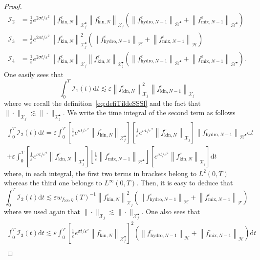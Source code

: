 \documentclass[10pt]{amsart}
\theoremstyle{definition}\newtheorem{defi}[theo]{Definition}\newtheorem{rema}[theo]{Remark}\newtheorem{exam}[theo]{Example}\newtheorem{exem}[theo]{Example}\newtheorem{nota}[theo]{Notation}
\newcommand{\ns}{\mathrm{NS}}
\newcommand{\hyd}{\mathrm{hydro}}
\newcommand{\mix}{\mathrm{mix}}
\newcommand{\kin}{\mathrm{kin}}
\renewcommand{\d}{\mathrm{d}}
\newcommand{\XX}{\mathcal{X}}
\newcommand{\HH}{\mathcal{H}}
\newcommand{\FFF}{\mathscr{F}}
\newcommand{\HHH}{\mathscr{H}}
\newcommand{\GGG}{\mathscr{X}}
\newcommand{\scI}{\mathscr{I}}
\newcommand{\SSs}{\HH}
\newcommand{\SSsp}{\HH^{\bullet}}
\newcommand{\SSSs}{\HHH}
\newcommand{\SSh}{\bm{\XX}}
\newcommand{\SShp}{\bm{\XX}^{\bullet}}
\newcommand{\SSSh}{\pmb{\GGG}}
\newcommand{\SSSm}{\FFF}
\newcommand*\eps{{\varepsilon}}
\begin{document}
\begin{proof}
\begin{align*}
\scI_2 &= \frac{1}{\eps} e^{2 \sigma t / \eps^2} \left\| f^\eps_{\kin, N}\right\|_{\SShp_{j}} \left\| f^\eps_{\kin, N}\right\|_{\SSh_j} \left(\left\| f^\eps_{\hyd, N-1}\right\|_{\SSsp} + \left\| f^\eps_{\mix, N-1}\right\|_{\SSsp} \right) \\
\scI_3 &=\frac{1}{\eps} e^{2 \sigma t / \eps^2} \left\| f^\eps_{\kin, N}\right\|_{\SShp_{j}}^2 \left(\left\| f^\eps_{\hyd, N-1} \right\|_{\SSs} + \left\| f^\eps_{\mix, N-1}\right\|_{\SSs} \right) \\
\scI_4&=\frac{1}{\eps} e^{2 \sigma t / \eps^2} \left\| f^\eps_{\kin, N}\right\|_{\SSh_j} \left\| f^\eps_{\kin, N}\right\|_{\SShp_{j}} \left(\left\| f^\eps_{\hyd, N-1}\right\|_{\SSsp} + \left\| f^\eps_{\mix, N-1}\right\|_{\SSsp} \right).
\end{align*}
One easily sees that
\[
\int_0^T\scI_1(t) \d t \lesssim \eps \left\| f_{\kin,N}^\eps\right\|_{\SSSh_j}^2\,\left\| f_{\kin,N-1}^\eps\right\|_{\SSSh_j}
\]
where we recall the definition~\eqref{eq:defiTildeSSSl} and the fact that $\|\cdot\|_{\SSh_j} \lesssim \|\cdot\|_{\SShp_{j}}$. We write the time integral of the second term as follows
\begin{multline*}
\int_0^T \scI_2(t)\d t=\eps \int_0^T \left[\frac{1}{\eps} e^{\sigma t / \eps^2} \left\| f^\eps_{\kin, N} \right\|_{\SShp_{j}} \right] \left[\frac{1}{\eps} e^{\sigma t / \eps^2 } \left\| f^\eps_{\kin, N}\right\|_{\SSh_j} \right] \left\| f^\eps_{\hyd, N-1} \right\|_{\SSsp} \d t\\
+\eps \int_0^T \left[\frac{1}{\eps} e^{\sigma t / \eps^2} \left\| f^\eps_{\kin, N}\right\|_{\SShp_{j}} \right]\left[\frac{1}{\eps}\left\| f^\eps_{\mix, N-1} \right\|_{\SSsp} \right] \left[e^{\sigma t / \eps^2 } \left\| f^\eps_{\kin, N}\right\|_{\SSh_j} \right] \d t
\end{multline*}
where, in each integral, the first two terms in brackets belong to $L^2(0,T)$ whereas the third one belongs to $L^\infty(0,T)$. Then, it is easy to deduce that
\[
\int_0^T \scI_2(t) \d t\lesssim \eps w_{ f_\ns, \eta }(T)^{-1} \left\| f^\eps_{\kin, N} \right\|^2_{\SSSh_j} \left(\left\| f^\eps_{\hyd, N-1}\right\|_\SSSs + \left\| f^\eps_{\mix, N-1}\right\|_\SSSm \right)\,
\]
where we used again that $\|\cdot\|_{\SSh_j} \lesssim \|\cdot\|_{\SShp_{j}}$. One also sees that
\begin{multline*}
\int_0^T\scI_3(t)\d t \lesssim
\eps \int_0^T \left[\frac{1}{\eps} e^{\sigma t / \eps^2} \left\| f^\eps_{\kin, N}\right\|_{\SShp_{j}} \right]^2 \left(\left\| f^\eps_{\hyd, N-1}\right\|_{\SSs} + \left\| f^\eps_{\mix, N-1}\right\|_{\SSs} \right) \d t \\

\end{multline*}
\end{proof}
\end{document}
